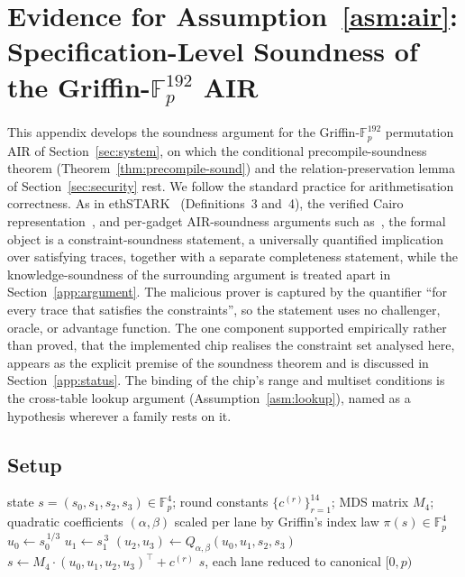 \section{Evidence for Assumption~\ref{asm:air}: Specification-Level Soundness of the Griffin-$\mathbb{F}_p^{192}$ AIR}\label{app:proofs}
This appendix develops the soundness argument for the Griffin-$\mathbb{F}_p^{192}$ permutation AIR of Section~\ref{sec:system}, on which the conditional precompile-soundness theorem (Theorem~\ref{thm:precompile-sound}) and the relation-preservation lemma of Section~\ref{sec:security} rest. We follow the standard practice for arithmetisation correctness. As in ethSTARK~\cite{ethstark} (Definitions~3 and~4), the verified Cairo representation~\cite{cairoverify}, and per-gadget AIR-soundness arguments such as~\cite{divremair}, the formal object is a constraint-soundness statement, a universally quantified implication over satisfying traces, together with a separate completeness statement, while the knowledge-soundness of the surrounding argument is treated apart in Section~\ref{app:argument}. The malicious prover is captured by the quantifier ``for every trace that satisfies the constraints'', so the statement uses no challenger, oracle, or advantage function. The one component supported empirically rather than proved, that the implemented chip realises the constraint set analysed here, appears as the explicit premise of the soundness theorem and is discussed in Section~\ref{app:status}. The binding of the chip's range and multiset conditions is the cross-table lookup argument (Assumption~\ref{asm:lookup}), named as a hypothesis wherever a family rests on it.

\subsection{Setup}\label{app:air-setup}
\begin{algorithm}[H]
\caption{Reference Griffin-$\pi$ permutation over $\mathbb{F}_p^4$ at the
  deployed parameters}
\label{alg:griffin-pi}
\begin{algorithmic}[1]
\Require state $s=(s_0,s_1,s_2,s_3)\in\mathbb{F}_p^4$;
         round constants $\{c^{(r)}\}_{r=1}^{14}$;
         MDS matrix $M_4$; quadratic coefficients $(\alpha,\beta)$
         scaled per lane by Griffin's index law
\Ensure  $\pi(s)\in\mathbb{F}_p^4$
  \State $u_0 \gets s_0^{\,1/3}$
  \State $u_1 \gets s_1^{\,3}$
  \State $(u_2, u_3) \gets Q_{\alpha,\beta}(u_0, u_1, s_2, s_3)$
  \State $s \gets M_4 \cdot (u_0, u_1, u_2, u_3)^{\top} + c^{(r)}$
\EndFor
\State \Return $s$, each lane reduced to canonical $[0,p)$
\end{algorithmic}
\end{algorithm}

